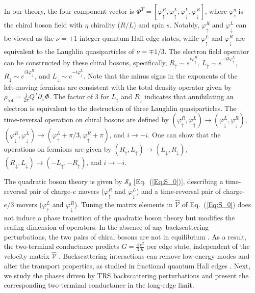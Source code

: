 \documentclass[aps,prx,amsmath,superscriptaddress,twocolumn,bibnotes,longbibliography,floatfix]{revtex4-2}
\begin{document}
	In our theory, the four-component vector is $\Phi^T=[\varphi^R_{\uparrow},\varphi^L_{\uparrow},\varphi^L_{\downarrow},\varphi^R_{\downarrow}]$, where $\varphi^{\eta}_{s}$ is the chiral boson field with $\eta$ chirality ($R/L$) and spin $s$. Notably, $\varphi^R_\uparrow$ and $\varphi^L_\downarrow$ can be viewed as the $\nu=\pm 1$ integer quantum Hall edge states, while $\varphi^L_\uparrow$ and $\varphi^R_\downarrow$ are equivalent to the Laughlin quasiparticles of $\nu=\mp 1/3$. The electron field operator can be constructed by these chiral bosons, specifically, $R_{\uparrow}\sim e^{i\varphi^R_{\uparrow}}$, $L_{\uparrow}\sim e^{-i3\varphi^L_{\uparrow}}$, $R_{\downarrow}\sim e^{i3\varphi^R_{\downarrow}}$, and $L_{\downarrow}\sim e^{-i\varphi^L_{\downarrow}}$. Note that the minus signs in the exponents of the left-moving fermions are consistent with the total density operator given by $\rho_{\text{tot}}=\frac{1}{2\pi}Q^T\partial_x\Phi$. The factor of $3$ for $L_{\uparrow}$ and $R_{\downarrow}$ indicates that annihilating an electron is equivalent to the destruction of three Laughlin quasiparticles.
	The time-reversal operation on chiral bosons are defined by \cite{NeupertT2011a} $(\varphi^R_{\uparrow},\varphi^L_{\uparrow})\rightarrow(\varphi^L_{\downarrow},\varphi^R_{\downarrow})$, $(\varphi^R_{\downarrow},\varphi^L_{\downarrow})\rightarrow(\varphi^L_{\uparrow}+\pi/3,\varphi^R_{\uparrow}+\pi)$, and $i\rightarrow -i$. One can show that the operations on fermions are given by $(R_{\uparrow},L_{\uparrow})\rightarrow (L_{\downarrow},R_{\downarrow})$, $(R_{\downarrow},L_{\downarrow})\rightarrow (-L_{\uparrow},-R_{\uparrow})$, and $i\rightarrow-i$.

	The quadratic boson theory is given by $\mathcal{S}_0$ [Eq.~(\ref{Eq:S_0})], describing a time-reversal pair of charge-$e$ movers ($\varphi^R_{\uparrow}$ and $\varphi^L_{\downarrow}$) and a time-reversal pair of charge-$e/3$ movers ($\varphi^L_{\uparrow}$ and $\varphi^R_{\downarrow}$). Tuning the matrix elements in $\hat{\mathcal{V}}$ of Eq.~(\ref{Eq:S_0}) does not induce a phase transition of the quadratic boson theory but modifies the scaling dimension of operators. In the absence of any backscattering perturbations, the two pairs of chiral bosons are not in equilibrium \cite{KaneCL1994}. As a result, the two-terminal conductance predicts $G=\frac{4}{3}\frac{e^2}{h}$ per edge state, independent of the velocity matrix $\hat{\mathcal{V}}$ \cite{ProtopopovIV2017,NosigliaC2018}. Backscattering interactions can remove low-energy modes and alter the transport properties, as studied in fractional quantum Hall edges \cite{MooreJE1998,MooreJE2002,VayrynenJI2022,YutushuiM2024a,ParkJ2024a}. Next, we study the phases driven by TRS backscattering perturbations and present the corresponding two-terminal conductance in the long-edge limit.
\end{document}
